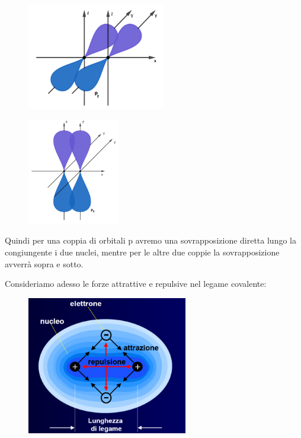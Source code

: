 \hspace{1cm}\begin{minipage}{0.5\textwidth}
    \begin{figure}[H]
        \includegraphics[width=6cm]{immagini/orbitali_py.png}
    \end{figure}
    \end{minipage} \hfill
    \begin{minipage}{0.5\textwidth}
    \begin{figure}[H]
        \includegraphics[width=4cm]{immagini/orbitali_pz.png}
    \end{figure}
    \end{minipage}

Quindi per una coppia di orbitali p avremo una sovrapposizione diretta lungo la congiungente i due nuclei, mentre per le altre due coppie la sovrapposizione avverrà sopra e sotto.

\vspace{0.2cm}Consideriamo adesso le forze attrattive e repulsive nel legame covalente:

\begin{figure}[H]
    \centering
    \includegraphics[width=7cm]{immagini/forze_legame_covalente.png}
\end{figure}
 
